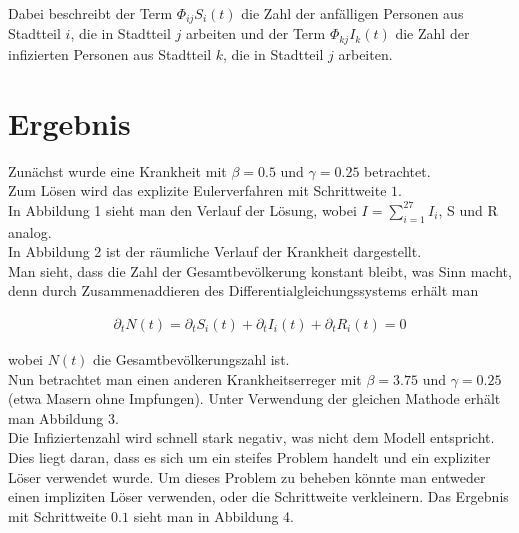 \documentclass[11pt,a4paper]{article}
\begin{document}
Dabei beschreibt der Term $\Phi_{ij}S_i(t)$ die Zahl der anf\"alligen Personen aus Stadtteil $i$, die in Stadtteil $j$ arbeiten und der Term $\Phi_{kj}I_k(t)$ die Zahl der infizierten Personen aus Stadtteil $k$, die in Stadtteil $j$ arbeiten.
  
  \section*{Ergebnis}
  
  Zun\"achst wurde eine Krankheit mit $\beta = 0.5$ und $\gamma = 0.25$ betrachtet.\\
  Zum L\"osen wird das explizite Eulerverfahren mit Schrittweite $1$.\\
  

In Abbildung 1 sieht man den Verlauf der L\"osung, wobei $I=\sum_{i=1}^{27}I_i$, S und R analog.\\

In Abbildung 2 ist der r\"aumliche Verlauf der Krankheit dargestellt.\\

Man sieht, dass die Zahl der Gesamtbev\"olkerung konstant bleibt, was Sinn macht, denn durch Zusammenaddieren des Differentialgleichungssystems erh\"alt man

\begin{align*}
\partial_tN(t)=\partial_tS_i(t)+\partial_tI_i(t)+\partial_tR_i(t)=0
\end{align*}

wobei $N(t)$ die Gesamtbev\"olkerungszahl ist.\\

Nun betrachtet man einen anderen Krankheitserreger mit $\beta = 3.75$ und $\gamma = 0.25$ (etwa Masern ohne Impfungen). Unter Verwendung der gleichen Mathode erh\"alt man Abbildung 3.\\

Die Infiziertenzahl wird schnell stark negativ, was nicht dem Modell entspricht. Dies liegt daran, dass es sich um ein steifes Problem handelt und ein expliziter L\"oser verwendet wurde. Um dieses Problem zu beheben k\"onnte man entweder einen impliziten L\"oser verwenden, oder die Schrittweite verkleinern. Das Ergebnis mit Schrittweite $0.1$ sieht man in Abbildung 4.
  
\end{document}
